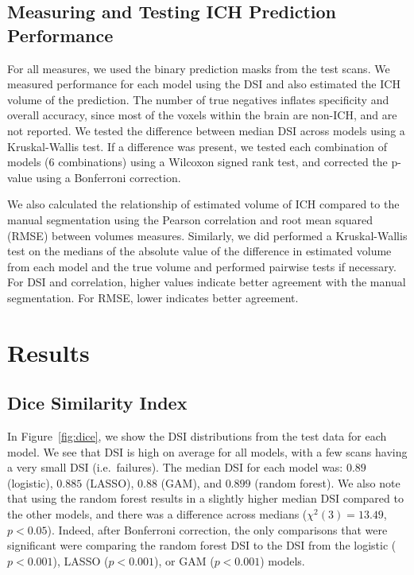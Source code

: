 \subsection{Measuring and Testing ICH Prediction Performance}





For all measures, we used the binary prediction masks from the test scans.  We measured performance for each model using the DSI and also estimated the ICH volume of the prediction. The number of true negatives inflates specificity and overall accuracy, since most of the voxels within the brain are non-ICH, and are not reported.  We tested the difference between median DSI across models using a Kruskal-Wallis test.  If a difference was present, we tested each combination of models ($6$ combinations) using a Wilcoxon signed rank test, and corrected the p-value using a Bonferroni correction.


We also calculated the relationship of estimated volume of ICH compared to the manual segmentation using the Pearson correlation and root mean squared (RMSE) between volumes measures.  Similarly, we did performed a Kruskal-Wallis test on the medians of the absolute value of the difference in estimated volume from each model and the true volume and performed pairwise tests if necessary.  For DSI and correlation, higher values indicate better agreement with the manual segmentation.  For RMSE, lower indicates better agreement.


\section{Results}

\subsection{Dice Similarity Index}
In Figure~\ref{fig:dice}, we show the DSI distributions from the test data for each model.  We see that DSI is high on average for all models, with a few scans having a very small DSI (i.e.~failures).   The median DSI for each model was: $0.89$ (logistic), $0.885$  (LASSO), $0.88$ (GAM), and $0.899$ (random forest). 
We also note that using the random forest results in a slightly higher median DSI compared to the other models, and there was a difference across medians ($\chi^{2}(3)=13.49$, $p < 0.05$).  Indeed, after Bonferroni correction, the only comparisons that were significant were comparing the random forest DSI to the DSI from the logistic ($p < 0.001$), LASSO ($p < 0.001$), or GAM ($p < 0.001$) models.

